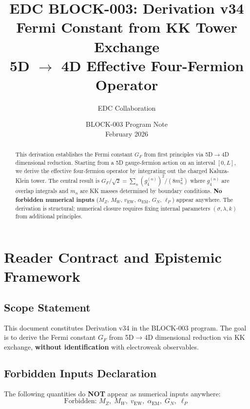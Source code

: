 \documentclass[11pt,a4paper]{article}
\title{\textbf{EDC BLOCK-003: Derivation v34}\\[0.5em]
\Large Fermi Constant from KK Tower Exchange\\[0.3em]
\large 5D $\to$ 4D Effective Four-Fermion Operator}
\author{EDC Collaboration}
\date{BLOCK-003 Program Note\\February 2026}
\begin{document}
\maketitle

\begin{abstract}
This derivation establishes the Fermi constant $G_F$ from first principles via
5D$\to$4D dimensional reduction. Starting from a 5D gauge-fermion action on an
interval $[0,L]$, we derive the effective four-fermion operator by integrating
out the charged Kaluza-Klein tower. The central result is
$G_F/\sqrt{2} = \sum_n (g_4^{(n)})^2/(8m_n^2)$ where $g_4^{(n)}$ are overlap
integrals and $m_n$ are KK masses determined by boundary conditions.
\textbf{No forbidden numerical inputs} ($M_Z$, $M_W$, $v_{\text{EW}}$, $\alpha_{\text{EM}}$,
$G_N$, $\ell_P$) appear anywhere. The derivation is structural; numerical closure
requires fixing internal parameters $(\sigma, \lambda, k)$ from additional principles.
\end{abstract}

\tableofcontents
\newpage

\section{Reader Contract and Epistemic Framework}
\label{sec:contract}

\subsection{Scope Statement}

This document constitutes Derivation v34 in the BLOCK-003 program. The goal is to
derive the Fermi constant $G_F$ from 5D$\to$4D dimensional reduction via KK exchange,
\textbf{without identification} with electroweak observables.

\subsection{Forbidden Inputs Declaration}

The following quantities do \textbf{NOT} appear as numerical inputs anywhere:
\begin{equation}
\boxed{\text{Forbidden: } M_Z,\; M_W,\; v_{\text{EW}},\; \alpha_{\text{EM}},\; G_N,\; \ell_P}
\label{eq:forbidden}
\end{equation}
\end{document}
